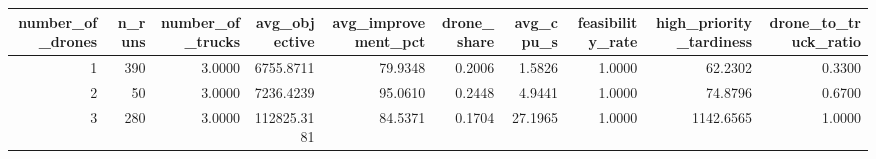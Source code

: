 \begin{tabular}{rrrrrrrrrr}
\toprule
number_of_drones & n_runs & number_of_trucks & avg_objective & avg_improvement_pct & drone_share & avg_cpu_s & feasibility_rate & high_priority_tardiness & drone_to_truck_ratio \\
\midrule
1 & 390 & 3.0000 & 6755.8711 & 79.9348 & 0.2006 & 1.5826 & 1.0000 & 62.2302 & 0.3300 \\
2 & 50 & 3.0000 & 7236.4239 & 95.0610 & 0.2448 & 4.9441 & 1.0000 & 74.8796 & 0.6700 \\
3 & 280 & 3.0000 & 112825.3181 & 84.5371 & 0.1704 & 27.1965 & 1.0000 & 1142.6565 & 1.0000 \\
\bottomrule
\end{tabular}
